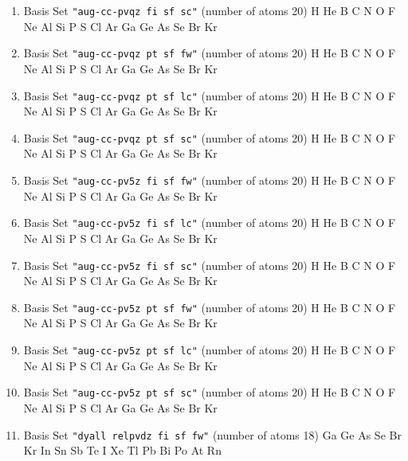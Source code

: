 \begin{enumerate}
\item Basis Set \verb#"aug-cc-pvqz fi sf sc"# (number of atoms 20)  \newline 
  H He B C N O F Ne Al Si P S Cl Ar Ga Ge As Se Br Kr


\item Basis Set \verb#"aug-cc-pvqz pt sf fw"# (number of atoms 20)  \newline 
  H He B C N O F Ne Al Si P S Cl Ar Ga Ge As Se Br Kr


\item Basis Set \verb#"aug-cc-pvqz pt sf lc"# (number of atoms 20)  \newline 
  H He B C N O F Ne Al Si P S Cl Ar Ga Ge As Se Br Kr


\item Basis Set \verb#"aug-cc-pvqz pt sf sc"# (number of atoms 20)  \newline 
  H He B C N O F Ne Al Si P S Cl Ar Ga Ge As Se Br Kr


\item Basis Set \verb#"aug-cc-pv5z fi sf fw"# (number of atoms 20)  \newline 
  H He B C N O F Ne Al Si P S Cl Ar Ga Ge As Se Br Kr


\item Basis Set \verb#"aug-cc-pv5z fi sf lc"# (number of atoms 20)  \newline 
  H He B C N O F Ne Al Si P S Cl Ar Ga Ge As Se Br Kr


\item Basis Set \verb#"aug-cc-pv5z fi sf sc"# (number of atoms 20)  \newline 
  H He B C N O F Ne Al Si P S Cl Ar Ga Ge As Se Br Kr


\item Basis Set \verb#"aug-cc-pv5z pt sf fw"# (number of atoms 20)  \newline 
  H He B C N O F Ne Al Si P S Cl Ar Ga Ge As Se Br Kr


\item Basis Set \verb#"aug-cc-pv5z pt sf lc"# (number of atoms 20)  \newline 
  H He B C N O F Ne Al Si P S Cl Ar Ga Ge As Se Br Kr


\item Basis Set \verb#"aug-cc-pv5z pt sf sc"# (number of atoms 20)  \newline 
  H He B C N O F Ne Al Si P S Cl Ar Ga Ge As Se Br Kr


\item Basis Set \verb#"dyall relpvdz fi sf fw"# (number of atoms 18)  \newline 
  Ga Ge As Se Br Kr In Sn Sb Te I Xe Tl Pb Bi Po At Rn



\end{enumerate}
